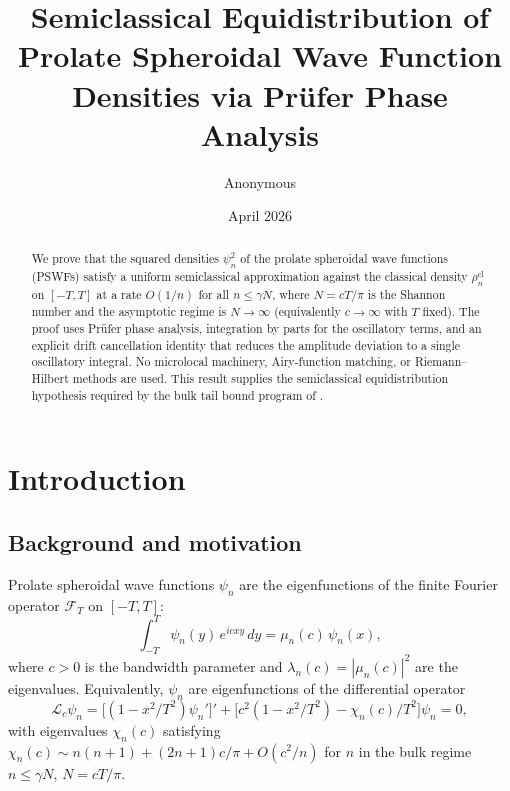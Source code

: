\documentclass[12pt,a4paper]{amsart}
\newcommand{\psin}{\psi_n}
\newcommand{\rhocl}{\rho^{\mathrm{cl}}}
\begin{document}
\title[Semiclassical Equidistribution of PSWF Densities]%
{Semiclassical Equidistribution of Prolate Spheroidal Wave Function
Densities via Pr\"ufer Phase Analysis}

\author{Anonymous}
\date{April 2026}
\maketitle

\begin{abstract}
We prove that the squared densities $\psin^2$ of the prolate
spheroidal wave functions (PSWFs) satisfy a uniform semiclassical
approximation against the classical density $\rhocl_n$ on $[-T,T]$
at a rate $O(1/n)$ for all $n \le \gamma N$, where $N = cT/\pi$
is the Shannon number and the asymptotic regime is $N \to \infty$
(equivalently $c \to \infty$ with $T$ fixed).
The proof uses Pr\"ufer phase analysis, integration by parts for
the oscillatory terms, and an explicit drift cancellation identity
that reduces the amplitude deviation to a single oscillatory
integral. No microlocal machinery, Airy-function matching, or
Riemann--Hilbert methods are used.
This result supplies the semiclassical equidistribution hypothesis
required by the bulk tail bound program of \cite{PaperIII}.
\end{abstract}

\section{Introduction}\label{sec:intro}

\subsection{Background and motivation}

Prolate spheroidal wave functions $\psin$ are the eigenfunctions
of the finite Fourier operator $\mathcal{F}_T$ on $[-T,T]$:
\[
  \int_{-T}^T \psin(y)\,e^{icxy}\,dy = \mu_n(c)\,\psin(x),
\]
where $c > 0$ is the bandwidth parameter and
$\lambda_n(c) = |\mu_n(c)|^2$ are the eigenvalues.
Equivalently, $\psin$ are eigenfunctions of the differential
operator
\[
  \mathcal{L}_c\psin
  = \bigl[(1-x^2/T^2)\psin'\bigr]'
    + \bigl[c^2(1-x^2/T^2) - \chi_n(c)/T^2\bigr]\psin = 0,
\]
with eigenvalues $\chi_n(c)$ satisfying
$\chi_n(c) \sim n(n+1) + (2n+1)c/\pi + O(c^2/n)$
for $n$ in the bulk regime $n \le \gamma N$, $N = cT/\pi$.
\end{document}
